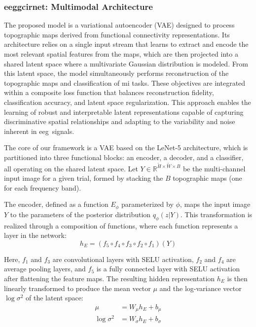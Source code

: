 \subsubsection{\gls{eeggcirnet}: Multimodal Architecture}\label{subsec:model}

The proposed model is a variational autoencoder (VAE) designed to process topographic maps derived from functional connectivity representations. Its architecture relies on a single input stream that learns to extract and encode the most relevant spatial features from the maps, which are then projected into a shared latent space where a multivariate Gaussian distribution is modeled. From this latent space, the model simultaneously performs reconstruction of the topographic maps and classification of \gls{mi} tasks. These objectives are integrated within a composite loss function that balances reconstruction fidelity, classification accuracy, and latent space regularization. This approach enables the learning of robust and interpretable latent representations capable of capturing discriminative spatial relationships and adapting to the variability and noise inherent in \mbox{\gls{eeg} signals.}

The core of our framework is a VAE based on the LeNet-5 architecture, which is partitioned into three functional blocks: an encoder, a decoder, and a classifier, all operating on the shared latent space. Let $Y \in \mathbb{R}^{\tilde{H} \times \tilde{W} \times B}$ be the multi-channel input image for a given trial, formed by stacking the $B$ topographic maps (one for each frequency band).

The encoder, defined as a function $E_{\phi}$ parameterized by $\phi$, maps the input image $Y$ to the parameters of the posterior distribution $q_{\phi}(z|Y)$. This transformation is realized through a composition of functions, where each function represents a layer in the network:
\begin{equation}
    h_E = (f_5 \circ f_4 \circ f_3 \circ f_2 \circ f_1)(Y)
\end{equation}

Here, $f_1$ and $f_3$ are convolutional layers with {SELU} activation, $f_2$ and $f_4$ are average pooling layers, and $f_5$ is a fully connected layer with {SELU} activation after flattening the feature maps. The resulting hidden representation $h_E$ is then linearly transformed to produce the mean vector $\mu$ and the log-variance vector $\log \sigma^2$ of the latent space:
\begin{align}
    \mu &= W_{\mu}h_E + b_{\mu} \\
    \log \sigma^2 &= W_{\sigma}h_E + b_{\sigma}
\end{align}

